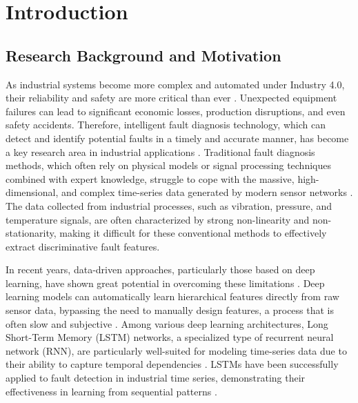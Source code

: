 \chapter{Introduction}
\label{cha:introduction}

\section{Research Background and Motivation}
\label{sec:introduction:background_motivation}

As industrial systems become more complex and automated under Industry 4.0, their reliability and safety are more critical than ever \cite{chen2017industry}. Unexpected equipment failures can lead to significant economic losses, production disruptions, and even safety accidents. Therefore, intelligent fault diagnosis technology, which can detect and identify potential faults in a timely and accurate manner, has become a key research area in industrial applications \cite{zhang2019deep, zhao2019deep}. Traditional fault diagnosis methods, which often rely on physical models or signal processing techniques combined with expert knowledge, struggle to cope with the massive, high-dimensional, and complex time-series data generated by modern sensor networks \cite{lei2016intelligent}. The data collected from industrial processes, such as vibration, pressure, and temperature signals, are often characterized by strong non-linearity and non-stationarity, making it difficult for these conventional methods to effectively extract discriminative fault features.

In recent years, data-driven approaches, particularly those based on deep learning, have shown great potential in overcoming these limitations \cite{liu2018artificial}. Deep learning models can automatically learn hierarchical features directly from raw sensor data, bypassing the need to manually design features, a process that is often slow and subjective \cite{khan2018review}. Among various deep learning architectures, Long Short-Term Memory (LSTM) networks, a specialized type of recurrent neural network (RNN), are particularly well-suited for modeling time-series data due to their ability to capture temporal dependencies \cite{hochreiter1997long}. LSTMs have been successfully applied to fault detection in industrial time series, demonstrating their effectiveness in learning from sequential patterns \cite{filonov2016multivariateindustrialtimeseries}. 

